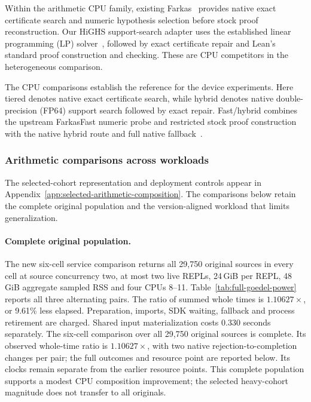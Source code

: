 \documentclass[10pt,twocolumn]{article}
\begin{document}
Within the arithmetic CPU family, existing Farkas~\cite{farkasSource}
provides native exact certificate search and numeric hypothesis selection before
stock proof reconstruction. Our HiGHS support-search adapter uses the established
linear programming (LP) solver~\cite{highsSimplex}, followed by exact certificate repair and Lean's standard
proof construction and checking. These are CPU competitors in the
heterogeneous comparison.

The CPU comparisons establish the reference for the device experiments. Here tiered denotes native exact certificate search, while hybrid denotes
native double-precision (FP64) support search followed by exact repair.
Fast/hybrid combines the upstream FarkasFast numeric probe and restricted
stock proof construction with the native hybrid route and full native
fallback~\cite{farkasSource}.

\subsubsection{Arithmetic comparisons across workloads}
The selected-cohort representation and deployment controls appear in
Appendix~\ref{app:selected-arithmetic-composition}. The comparisons below
retain the complete original population and the version-aligned workload
that limits generalization.

\paragraph{Complete original population.}
The new six-cell service comparison returns all 29,750 original sources in
every cell at source concurrency two, at most two live REPLs, 24\,GiB per
REPL, 48\,GiB aggregate sampled RSS and four CPUs 8--11.
Table~\ref{tab:full-goedel-power} reports all three alternating pairs.
The ratio of summed whole times is $1.10627\times$, or 9.61\% less elapsed.
Preparation, imports, SDK waiting, fallback and process retirement are charged.
Shared input materialization costs 0.330 seconds separately.
The six-cell comparison over all 29,750 original sources is complete. Its observed whole-time ratio is $1.10627\times$, with two native rejection-to-completion changes per pair; the full outcomes and resource point are reported below. Its clocks remain separate from the earlier resource points.
This complete population supports a modest CPU composition improvement;
the selected heavy-cohort magnitude does not transfer to all originals.
\end{document}
